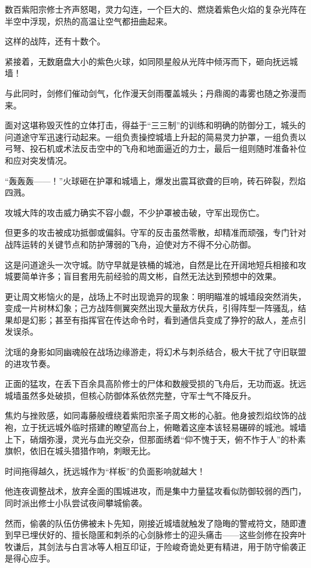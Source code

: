 数百紫阳宗修士齐声怒喝，灵力勾连，一个巨大的、燃烧着紫色火焰的复杂光阵在半空中浮现，炽热的高温让空气都扭曲起来。

这样的战阵，还有十数个。

紧接着，无数磨盘大小的紫色火球，如同陨星般从光阵中倾泻而下，砸向抚远城墙！

与此同时，剑修们催动剑气，化作漫天剑雨覆盖城头；丹鼎阁的毒雾也随之弥漫而来。

面对这堪称毁灭性的立体打击，得益于“三三制”的训练和明确的防御分工，城头的问道途守军迅速行动起来。一组负责操控城墙上升起的简易灵力护罩，一组负责以弓弩、投石机或术法反击空中的飞舟和地面逼近的力士，最后一组则随时准备补位和应对突发情况。

“轰轰轰——！”火球砸在护罩和城墙上，爆发出震耳欲聋的巨响，砖石碎裂，烈焰四溅。

攻城大阵的攻击威力确实不容小觑，不少护罩被击破，守军出现伤亡。

但更多的攻击被成功抵御或偏斜。守军的反击虽然零散，却精准而顽强，专门针对战阵运转的关键节点和防护薄弱的飞舟，迫使对方不得不分心防御。

这是问道途头一次守城。防守早就是铁桶的城池，自然是比在开阔地短兵相接和攻城要简单许多；盲目套用先前经验的周文彬，自然无法达到预想中的效果。

更让周文彬恼火的是，战场上不时出现诡异的现象：明明瞄准的城墙段突然消失，变成一片树林幻象；己方战阵侧翼突然出现大量敌方伏兵，引得阵型一阵骚乱，结果却是幻影；甚至有指挥官在传达命令时，看到通信兵变成了狰狞的敌人，差点引发误杀。

沈瑶的身影如同幽魂般在战场边缘游走，将幻术与刺杀结合，极大干扰了守旧联盟的进攻节奏。

正面的猛攻，在丢下百余具高阶修士的尸体和数艘受损的飞舟后，无功而返。抚远城墙虽然多处破损，但核心防御体系依然完整，守军士气不降反升。

焦灼与挫败感，如同毒藤般缠绕着紫阳宗圣子周文彬的心脏。他身披烈焰纹饰的战袍，立于抚远城外临时搭建的瞭望高台上，俯瞰着这座本该轻易碾碎的城池。城墙上下，硝烟弥漫，灵光与血光交杂，但那面绣着“仰不愧于天，俯不怍于人”的朴素旗帜，依旧在城头猎猎作响，刺眼无比。

时间拖得越久，抚远城作为“样板”的负面影响就越大！

他连夜调整战术，放弃全面的围城进攻，而是集中力量猛攻看似防御较弱的西门，同时派出修士小队尝试夜间攀城偷袭。

然而，偷袭的队伍仿佛被未卜先知，刚接近城墙就触发了隐晦的警戒符文，随即遭到早已埋伏好的、擅长隐匿和刺杀的心剑脉修士的迎头痛击——这些剑修在投奔叶牧谦后，其剑法与白言冰等人相互印证，于险峻奇诡处更有精进，用于防守偷袭正是得心应手。

